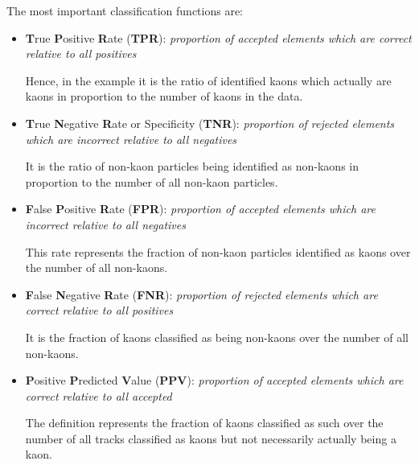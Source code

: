 The most important classification functions are:
\begin{itemize}
	\item
	\begin{samepage}
		\textbf{T}rue \textbf{P}ositive \textbf{R}ate (\textbf{TPR}): \textit{proportion of accepted elements which are correct relative to all positives}

		\nopagebreak
		Hence, in the example it is the ratio of identified kaons which actually are kaons in proportion to the number of kaons in the data.
	\end{samepage}


	\item
	\begin{samepage}
		\textbf{T}rue \textbf{N}egative \textbf{R}ate or Specificity (\textbf{TNR}): \textit{proportion of rejected elements which are incorrect relative to all negatives}

		\nopagebreak
		It is the ratio of non-kaon particles being identified as non-kaons in proportion to the number of all non-kaon particles.
	\end{samepage}

	\item
	\begin{samepage}
		\textbf{F}alse \textbf{P}ositive \textbf{R}ate (\textbf{FPR}): \textit{proportion of accepted elements which are incorrect relative to all negatives}

		\nopagebreak
		This rate represents the fraction of non-kaon particles identified as kaons over the number of all non-kaons.
	\end{samepage}

	\item
	\begin{samepage}
		\textbf{F}alse \textbf{N}egative \textbf{R}ate (\textbf{FNR}): \textit{proportion of rejected elements which are correct relative to all positives}

		\nopagebreak
		It is the fraction of kaons classified as being non-kaons over the number of all non-kaons.
	\end{samepage}

	\item
	\begin{samepage}
		\textbf{P}ositive \textbf{P}redicted \textbf{V}alue (\textbf{PPV}): \textit{proportion of accepted elements which are correct relative to all accepted}

		\nopagebreak
		The definition represents the fraction of kaons classified as such over the number of all tracks classified as kaons but not necessarily actually being a kaon.
	\end{samepage}
\end{itemize}

